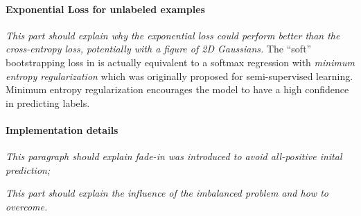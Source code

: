\paragraph{Exponential Loss for unlabeled examples}
\noindent
\textit{This part should explain why the exponential loss could perform better than the cross-entropy loss, potentially with a figure of 2D Gaussians.}
The ``soft'' bootstrapping loss in \cite{reed2014training} is actually equivalent to a softmax regression with \textit{minimum entropy regularization}\cite{grandvalet2005semi} which was originally proposed for semi-supervised learning.
Minimum entropy regularization encourages the model to have a high confidence in predicting labels.


\paragraph{Implementation details}
\noindent \textit{This paragraph should explain fade-in was introduced to avoid all-positive inital prediction;}

\noindent

\noindent
\textit{This part should explain the influence of the imbalanced problem and how to overcome.}



